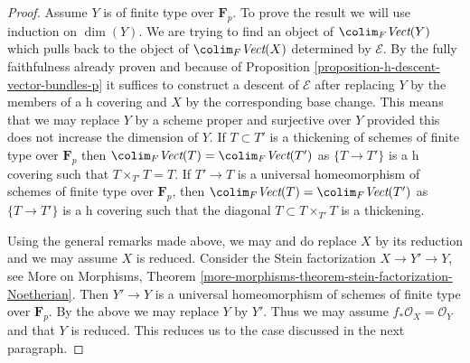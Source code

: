 \begin{proof}
\medskip\noindent
Assume $Y$ is of finite type over $\mathbf{F}_p$.
To prove the result we will use induction on $\dim(Y)$.
We are trying to find an object of
$\colim_F \textit{Vect}(Y)$ which pulls back to the
object of $\colim_F \textit{Vect}(X)$ determined by $\mathcal{E}$.
By the fully faithfulness already proven and because of
Proposition \ref{proposition-h-descent-vector-bundles-p}
it suffices to construct a descent of $\mathcal{E}$
after replacing $Y$ by the members of a h covering
and $X$ by the corresponding base change. This means
that we may replace $Y$ by a scheme proper and surjective
over $Y$ provided this does not increase the dimension of $Y$.
If $T \subset T'$ is a thickening of schemes of finite type
over $\mathbf{F}_p$ then
$\colim_F \textit{Vect}(T) = \colim_F \textit{Vect}(T')$
as $\{T \to T'\}$ is a h covering such that $T \times_{T'} T = T$.
If $T' \to T$ is a universal homeomorphism of schemes
of finite type over $\mathbf{F}_p$, then
$\colim_F \textit{Vect}(T) = \colim_F \textit{Vect}(T')$
as $\{T \to T'\}$ is a h covering such that the diagonal
$T \subset T \times_{T'} T$ is a thickening.

\medskip\noindent
Using the general remarks made above, we may and do replace
$X$ by its reduction and we may assume $X$ is reduced.
Consider the Stein factorization $X \to Y' \to Y$, see
More on Morphisms, Theorem
\ref{more-morphisms-theorem-stein-factorization-Noetherian}.
Then $Y' \to Y$ is a universal homeomorphism
of schemes of finite type over $\mathbf{F}_p$.
By the above we may replace $Y$ by $Y'$.
Thus we may assume $f_*\mathcal{O}_X = \mathcal{O}_Y$
and that $Y$ is reduced. This reduces us to the case discussed
in the next paragraph.


\end{proof}
